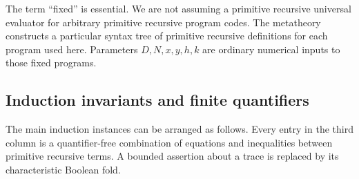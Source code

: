 \documentclass[11pt,letterpaper]{article}
\theoremstyle{definition}
\begin{document}
The term ``fixed'' is essential. We are not assuming a primitive recursive
universal evaluator for arbitrary primitive recursive program codes.
The metatheory constructs a particular syntax tree of primitive recursive
definitions for each program used here. Parameters $D,N,x,y,h,k$ are
ordinary numerical inputs to those fixed programs.

\subsection{Induction invariants and finite quantifiers}

The main induction instances can be arranged as follows. Every entry in
the third column is a quantifier-free combination of equations and
inequalities between primitive recursive terms. A bounded assertion about
a trace is replaced by its characteristic Boolean fold.
\end{document}
